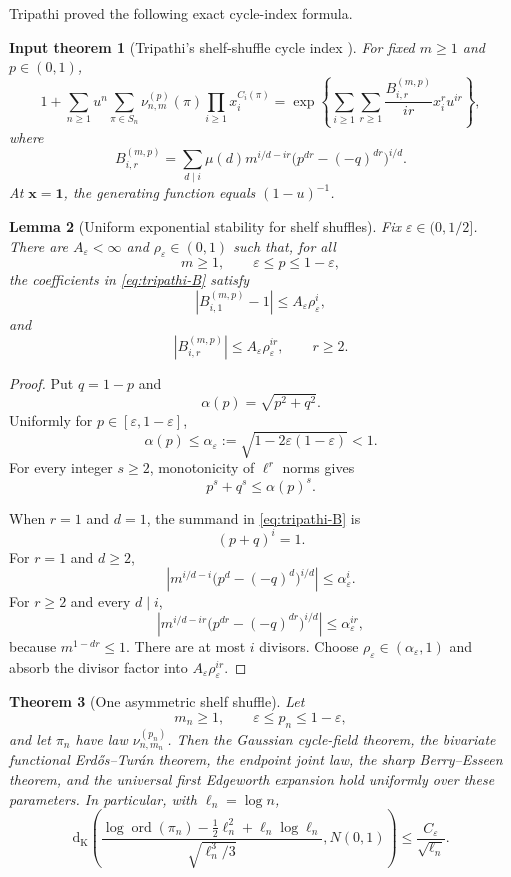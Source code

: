 \documentclass[11pt]{article}
\newtheorem{theorem}{Theorem}[section]
\newtheorem{lemma}[theorem]{Lemma}
\newtheorem{inputtheorem}[theorem]{Input theorem}
\theoremstyle{definition}
\theoremstyle{remark}
\newcommand{\ord}{\operatorname{ord}}
\newcommand{\Kol}{\mathrm d_{\mathrm K}}
\newcommand{\eps}{\varepsilon}
\begin{document}
Tripathi proved the following exact cycle-index formula.

\begin{inputtheorem}[Tripathi's shelf-shuffle cycle index
\cite{Tripathi2026}]\label{input:tripathi}
For fixed $m\ge1$ and $p\in(0,1)$,
\[
 1+\sum_{n\ge1}u^n
 \sum_{\pi\in S_n}\nu_{n,m}^{(p)}(\pi)
 \prod_{i\ge1}x_i^{C_i(\pi)}
 =
 \exp\left\{
 \sum_{i\ge1}\sum_{r\ge1}
 \frac{B_{i,r}^{(m,p)}}{ir}x_i^ru^{ir}
 \right\},
\]
where
\begin{equation}\label{eq:tripathi-B}
 B_{i,r}^{(m,p)}
 =
 \sum_{d\mid i}
 \mu(d)m^{i/d-ir}
 \bigl(p^{dr}-(-q)^{dr}\bigr)^{i/d}.
\end{equation}
At $\mathbf x=\mathbf1$, the generating function equals $(1-u)^{-1}$.
\end{inputtheorem}

\begin{lemma}[Uniform exponential stability for shelf shuffles]
\label{lem:shelf-stability}
Fix $\eps\in(0,1/2]$.  There are $A_\eps<\infty$ and
$\rho_\eps\in(0,1)$ such that, for all
\[
 m\ge1,\qquad \eps\le p\le1-\eps,
\]
the coefficients in \eqref{eq:tripathi-B} satisfy
\[
 |B_{i,1}^{(m,p)}-1|\le A_\eps\rho_\eps^i,
\]
and
\[
 |B_{i,r}^{(m,p)}|\le A_\eps\rho_\eps^{ir},
 \qquad r\ge2.
\]
\end{lemma}

\begin{proof}
Put $q=1-p$ and
\[
 \alpha(p)=\sqrt{p^2+q^2}.
\]
Uniformly for $p\in[\eps,1-\eps]$,
\[
 \alpha(p)\le
 \alpha_\eps:=\sqrt{1-2\eps(1-\eps)}<1.
\]
For every integer $s\ge2$, monotonicity of $\ell^r$ norms gives
\[
 p^s+q^s\le\alpha(p)^s.
\]

When $r=1$ and $d=1$, the summand in
\eqref{eq:tripathi-B} is
\[
 (p+q)^i=1.
\]
For $r=1$ and $d\ge2$,
\[
 \left|
 m^{i/d-i}\bigl(p^d-(-q)^d\bigr)^{i/d}
 \right|
 \le\alpha_\eps^i.
\]
For $r\ge2$ and every $d\mid i$,
\[
 \left|
 m^{i/d-ir}\bigl(p^{dr}-(-q)^{dr}\bigr)^{i/d}
 \right|
 \le\alpha_\eps^{ir},
\]
because $m^{1-dr}\le1$.  There are at most $i$ divisors.  Choose
$\rho_\eps\in(\alpha_\eps,1)$ and absorb the divisor factor into
$A_\eps\rho_\eps^{ir}$.
\end{proof}

\begin{theorem}[One asymmetric shelf shuffle]
\label{thm:shelf}
Let
\[
 m_n\ge1,
 \qquad
 \eps\le p_n\le1-\eps,
\]
and let $\pi_n$ have law $\nu_{n,m_n}^{(p_n)}$.  Then the Gaussian
cycle-field theorem, the bivariate functional Erd\H{o}s--Tur\'an theorem,
the endpoint joint law, the sharp Berry--Esseen theorem, and the universal
first Edgeworth expansion hold uniformly
over these parameters.  In particular, with $\ell_n=\log n$,
\[
 \Kol\!\left(
 \frac{\log\ord(\pi_n)-\frac12\ell_n^2
       +\ell_n\log\ell_n}
      {\sqrt{\ell_n^3/3}},N(0,1)
 \right)
 \le \frac{C_\eps}{\sqrt{\ell_n}}.
\]
\end{theorem}
\end{document}
